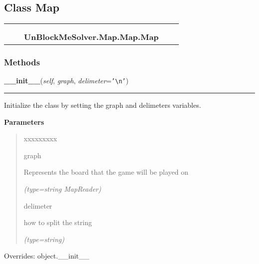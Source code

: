 \subsection{Class Map}

    \label{UnBlockMeSolver:Map:Map:Map}
\begin{tabular}{cccccc}
\multicolumn{2}{r}{\settowidth{\BCL}{object}\multirow{2}{\BCL}{object}}
&&
  \\\cline{3-3}
  &&\multicolumn{1}{c|}{}
&&
  \\
&&\multicolumn{2}{l}{\textbf{UnBlockMeSolver.Map.Map.Map}}
\end{tabular}



  \subsubsection{Methods}

    \vspace{0.5ex}

\hspace{.8\funcindent}\begin{boxedminipage}{\funcwidth}

    \raggedright \textbf{\_\_init\_\_}(\textit{self}, \textit{graph}, \textit{delimeter}={\tt \texttt{'}\texttt{{\textbackslash}n}\texttt{'}})

    \vspace{-1.5ex}

    \rule{\textwidth}{0.5\fboxrule}
\setlength{\parskip}{2ex}
    Initialize the class by setting the graph and delimeters variables.

\setlength{\parskip}{1ex}
      \textbf{Parameters}
      \vspace{-1ex}

      \begin{quote}
        \begin{Ventry}{xxxxxxxxx}

          \item[graph]

          Represents the board that the game will be played on

            {\it (type=string {\textbar} MapReader)}

          \item[delimeter]

          how to split the string

            {\it (type=string)}

        \end{Ventry}

      \end{quote}

      Overrides: object.\_\_init\_\_

    \end{boxedminipage}

